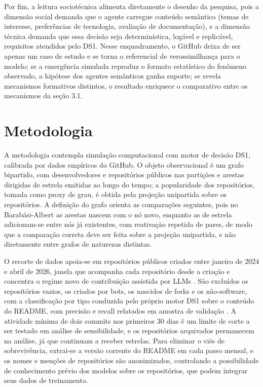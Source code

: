 \documentclass[12pt,oneside,a4paper,brazil,sumario=tradicional]{abntex2}
\begin{document}
Por fim, a leitura sociotécnica alimenta diretamente o desenho da pesquisa, pois a dimensão social demanda que o agente carregue conteúdo semântico (temas de interesse, preferências de tecnologia, avaliação de documentação), e a dimensão técnica demanda que essa decisão seja determinística, logável e replicável, requisitos atendidos pelo DS1. Nesse enquadramento, o GitHub deixa de ser apenas um caso de estudo e se torna o referencial de verossimilhança para o modelo; se a emergência simulada reproduz o formato estatístico do fenômeno observado, a hipótese dos agentes semânticos ganha suporte; se revela mecanismos formativos distintos, o resultado enriquece o comparativo entre os mecanismos da seção 3.1.

\section{Metodologia}

A metodologia contempla simulação computacional com motor de decisão DS1, calibrada por dados empíricos do GitHub. O objeto observacional é um grafo bipartido, com desenvolvedores e repositórios públicos nas partições e arestas dirigidas de estrela emitidas ao longo do tempo; a popularidade dos repositórios, tomada como proxy de grau, é obtida pela projeção unipartida sobre os repositórios. A definição do grafo orienta as comparações seguintes, pois no Barabási-Albert as arestas nascem com o nó novo, enquanto as de estrela adicionam-se entre nós já existentes, com reativação repetida de pares, de modo que a comparação correta deve ser feita sobre a projeção unipartida, e não diretamente entre grafos de naturezas distintas.

O recorte de dados apoia-se em repositórios públicos criados entre janeiro de 2024 e abril de 2026, janela que acompanha cada repositório desde a criação e concentra o regime novo de contribuição assistida por LLMs \parencite{gu2026, popescu2026, taillandier2026}. São excluídos os repositórios vazios, os criados por bots, os nascidos de forks e os não-software, com a classificação por tipo conduzida pelo próprio motor DS1 sobre o conteúdo do README, com precisão e recall relatados em amostra de validação \parencite{jiang2017, he2025b}. A atividade mínima de dois commits nos primeiros 30 dias é um limite de corte a ser testado em análise de sensibilidade, e os repositórios arquivados permanecem na análise, já que continuam a receber estrelas. Para eliminar o viés de sobrevivência, extrai-se a versão corrente do README em cada passo mensal, e os nomes e menções de repositórios são anonimizados, controlando a possibilidade de conhecimento prévio dos modelos sobre os repositórios, que podem integrar seus dados de treinamento.
\end{document}
